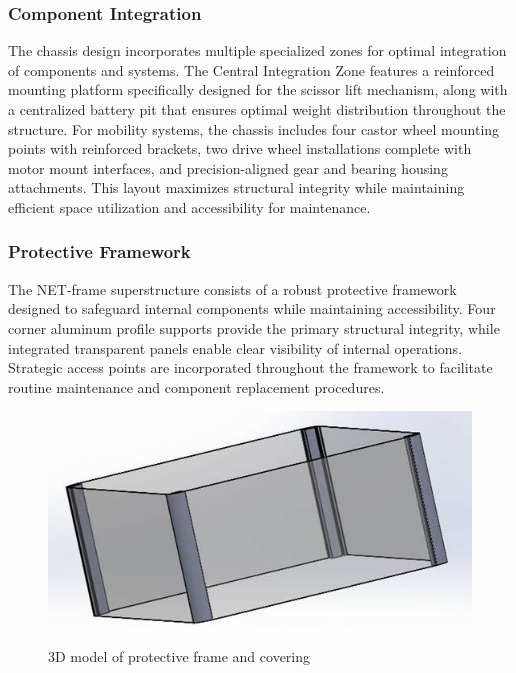 \documentclass[../../main]{subfiles}
\begin{document}
\subsubsection{Component Integration}\label{component-integration}

The chassis design incorporates multiple specialized zones for optimal
integration of components and systems. The Central Integration Zone
features a reinforced mounting platform specifically designed for the
scissor lift mechanism, along with a centralized battery pit that
ensures optimal weight distribution throughout the structure. For
mobility systems, the chassis includes four castor wheel mounting points
with reinforced brackets, two drive wheel installations complete with
motor mount interfaces, and precision-aligned gear and bearing housing
attachments. This layout maximizes structural integrity while
maintaining efficient space utilization and accessibility for
maintenance.

\subsubsection{Protective Framework}\label{protective-framework}

The NET-frame superstructure consists of a robust protective framework
designed to safeguard internal components while maintaining
accessibility. Four corner aluminum profile supports provide the primary
structural integrity, while integrated transparent panels enable clear
visibility of internal operations. Strategic access points are
incorporated throughout the framework to facilitate routine maintenance
and component replacement procedures.

\begin{figure}[h!]
  \centering
  \includegraphics[width=\textwidth]{img/image112.jpg}
  \caption{3D model of protective frame and covering}
  \end{figure}
  
\end{document}
